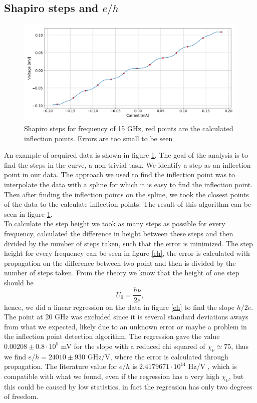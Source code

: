\documentclass[a4paper,10pt]{article}
\begin{document}
\subsection{Shapiro steps and $e/h$}
\begin{figure}[H]
\centering
\includegraphics[width = \textwidth]{shapirosteps}
\caption{Shapiro steps for frequency of 15 GHz, red points are the calculated inflection points. Errors are too small to be seen}\label{shapiro}
\end{figure}
An example of acquired data is shown in figure \ref{shapiro}. The goal of the analysis is to find the steps in the curve, a non-trivial task. We identify a step as an inflection point in our data. The approach we used to find the inflection point was to interpolate the data with a spline for which it is easy to find the inflection point. Then after finding the inflection points on the spline, we took the closest points of the data to the calculate inflection points. The result of this algorithm can be seen in figure \ref{shapiro}.\\
To calculate the step height we took as many steps as possible for every frequency, calculated the difference in height between these steps and then divided by the number of steps taken, such that the error is minimized. The step height for every frequency can be seen in figure \ref{eh}, the error is calculated with propagation on the difference between two point and then is divided by the number of steps taken. From the theory we know that the height of one step should be
\begin{equation}U_0 = \frac{h\nu}{2e},\end{equation}
hence, we did a linear regression on the data in figure \ref{eh} to find the slope $h/2e$. The point at 20 GHz was excluded since it is several standard deviations aways from what we expected, likely due to an unknown error or maybe a problem in the inflection point detection algorithm. The regression gave the value $0.00208\pm 0.8\cdot 10^5$ mV for the slope with a reduced chi squared of $\chi_\nu \simeq 75$, thus we find $e/h = 24010 \pm 930$ GHz/V, where the error is calculated through propagation. The literature value for $e/h$ is $ 2.4179671\cdot 10^{14}$ Hz/V \cite{skriptum}, which is compatible with what we found, even if the regression has a very high $\chi_\nu$, but this could be caused by low statistics, in fact the regression has only two degrees of freedom.
\end{document}

